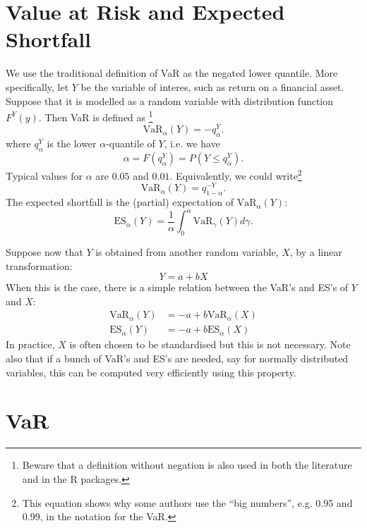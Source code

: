 \documentclass[nojss,article]{jss}
\newcommand{\VaR}[2][\alpha]{\text{VaR}_{#1}(#2)}
\newcommand{\ES}[2][\alpha]{\text{ES}_{#1}(#2)}
\begin{document}
\section{Value at Risk and Expected Shortfall}

We use the traditional definition of VaR as the negated lower quantile.  More specifically,
let $Y$ be the variable of interes, such as return on a financial asset. Suppose that it is
modelled as a random variable with distribution function $F^{Y}(y)$. Then VaR is defined as%
\footnote{Beware that a definition without negation is also used in both the literature and
  in the R packages.}
\begin{equation*}
  \VaR{Y}  = - q_{\alpha}^{Y}
  .
\end{equation*}
where $q_{\alpha}^{Y}$ is the lower $\alpha$-quantile of $Y$, i.e. we have
\begin{equation*}
  \alpha = F(q_{\alpha}^{Y}) = P(Y \le q_{\alpha}^{Y})
  .
\end{equation*}
Typical values for $\alpha$ are $0.05$ and $0.01$.
Equivalently, we could write\footnote{This equation shows why some authors use the ``big numbers'', e.g. 0.95 and 0.99, in the notation for the VaR.}
\begin{equation*}
  \VaR{Y}  = q_{1-\alpha}^{-Y}
  .
\end{equation*}
The expected shortfall is the (partial) expectation of $\VaR{Y}$:
\begin{equation*}
  \ES{Y} = \frac{1}{\alpha}\int_{0}^{\alpha}\VaR[\gamma]{Y} d\gamma
  .
\end{equation*}

Suppose now that $Y$ is obtained from another random variable, $X$, by a linear transformation:
\begin{equation*}
  Y = a + bX
\end{equation*}
When this is the case, there is a simple relation between the VaR's and ES's of $Y$ and $X$:
\begin{align*}
  \VaR{Y} &= -a + b \VaR{X} \\
   \ES{Y} &= -a + b \ES{X}
\end{align*}
In practice, $X$ is often chosen to be standardised but this is not necessary. Note also that
if a bunch of VaR's and ES's are needed, say for normally distributed variables, this can be
computed very efficiently using this property.

\section{VaR}
\label{sec:var}
\end{document}
